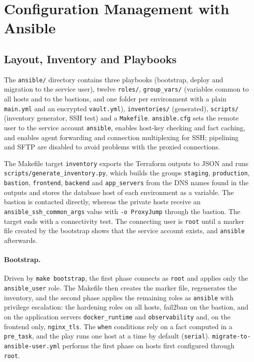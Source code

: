 \section{Configuration Management with Ansible}
\label{sec:impl-ansible}

\subsection{Layout, Inventory and Playbooks}

The \texttt{ansible/} directory contains three playbooks (bootstrap, deploy and migration to the service user), twelve \texttt{roles/}, \texttt{group\_vars/} (variables common to all hosts and to the bastions, and one folder per environment with a plain \texttt{main.yml} and an encrypted \texttt{vault.yml}), \texttt{inventories/} (generated), \texttt{scripts/} (inventory generator, SSH test) and a \texttt{Makefile}. \texttt{ansible.cfg} sets the remote user to the service account \texttt{ansible}, enables host-key checking and fact caching, and enables agent forwarding and connection multiplexing for SSH; pipelining and SFTP are disabled to avoid problems with the proxied connections.

The Makefile target \texttt{inventory} exports the Terraform outputs to JSON and runs \texttt{scripts/generate\_inventory.py}, which builds the groups \texttt{staging}, \texttt{production}, \texttt{bastion}, \texttt{frontend}, \texttt{backend} and \texttt{app\_servers} from the DNS names found in the outputs and stores the database host of each environment as a variable. The bastion is contacted directly, whereas the private hosts receive an \texttt{ansible\_ssh\_common\_args} value with \texttt{-o ProxyJump} through the bastion. The target ends with a connectivity test. The connecting user is \texttt{root} until a marker file created by the bootstrap shows that the service account exists, and \texttt{ansible} afterwards.

\paragraph{Bootstrap.} Driven by \texttt{make bootstrap}, the first phase connects as \texttt{root} and applies only the \texttt{ansible\_user} role. The Makefile then creates the marker file, regenerates the inventory, and the second phase applies the remaining roles as \texttt{ansible} with privilege escalation: the hardening roles on all hosts, fail2ban on the bastion, and on the application servers \texttt{docker\_runtime} and \texttt{observability} and, on the frontend only, \texttt{nginx\_tls}. The \texttt{when} conditions rely on a fact computed in a \texttt{pre\_task}, and the play runs one host at a time by default (\texttt{serial}). \texttt{migrate-to-ansible-user.yml} performs the first phase on hosts first configured through \texttt{root}.

